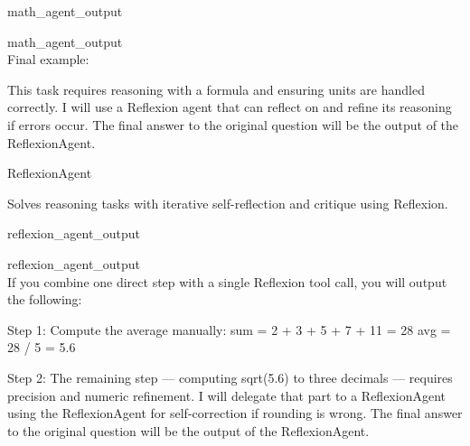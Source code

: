 \begin{userprompt}[title={User Prompt}]
\quad{}

\quad{}math_agent_output


math_agent_output
\\

Final example: \\


This task requires reasoning with a formula and ensuring units are handled correctly.
I will use a Reflexion agent that can reflect on and refine its reasoning if errors occur.
The final answer to the original question will be the output of the ReflexionAgent.



\quad{}ReflexionAgent

\quad{}
Solves reasoning tasks with iterative self-reflection and critique using Reflexion.

\quad{}

\qquad{}

\quad{}

\quad{}reflexion_agent_output


reflexion_agent_output \\


If you combine one direct step with a single Reflexion tool call, you will output the following:


Step 1: Compute the average manually:
\quad sum = 2 + 3 + 5 + 7 + 11 = 28
\quad avg = 28 / 5 = 5.6

Step 2:
\quad The remaining step — computing sqrt(5.6) to three decimals — requires precision and numeric refinement.
\quad I will delegate that part to a ReflexionAgent using the ReflexionAgent for self-correction if rounding is wrong.
\quad The final answer to the original question will be the output of the ReflexionAgent.




\end{userprompt}
